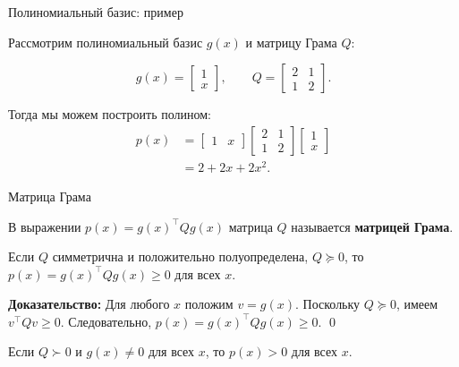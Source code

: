 \documentclass{beamer}
\begin{document}
\begin{frame}{Полиномиальный базис: пример}
	\begin{flushleft}
		
		Рассмотрим полиномиальный базис $g(x)$ и матрицу Грама $Q$:
		
		\[
		g(x)=
		\begin{bmatrix}
			1\\x
		\end{bmatrix},
		\qquad
		Q=
		\begin{bmatrix}
			2&1\\
			1&2
		\end{bmatrix}.
		\]
		
		Тогда мы можем построить полином:
		\[
		\begin{aligned}
			p(x)
			&=
			\begin{bmatrix}1&x\end{bmatrix}
			\begin{bmatrix}2&1\\1&2\end{bmatrix}
			\begin{bmatrix}1\\x\end{bmatrix}\\
			&=2+2x+2x^2.
		\end{aligned}
		\]
		
	\end{flushleft}
\end{frame}


\begin{frame}{Матрица Грама}
	\begin{flushleft}
		В выражении $p(x)=g(x)^\top Qg(x)$ матрица $Q$ называется
		\textbf{матрицей Грама}.
		
		\begin{theorem}
			Если $Q$ симметрична и положительно полуопределена, $Q \succeq 0$, то $p(x)=g(x)^\top Qg(x) \geq 0$ для всех $x$.
		\end{theorem}
		
		\textbf{Доказательство:} Для любого $x$ положим $v=g(x)$. Поскольку $Q\succeq0$, имеем $v^\top Qv\geq0$. Следовательно, $p(x)=g(x)^\top Qg(x)\geq0.$ \qed
		
		\bigskip
		
		Если $Q\succ0$ и $g(x)\neq0$ для всех $x$, то $p(x)>0$ для всех $x$.
		
	\end{flushleft}
\end{frame}
\end{document}
